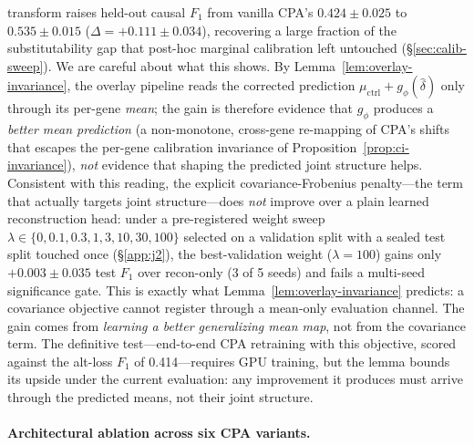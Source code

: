 \documentclass{article}
\theoremstyle{plain}
\theoremstyle{definition}
\theoremstyle{remark}
\begin{document}
transform raises held-out causal $F_1$ from vanilla CPA's $0.424 \pm 0.025$ to $0.535 \pm 0.015$ ($\Delta = +0.111 \pm 0.034$), recovering a large fraction of the substitutability gap that post-hoc marginal calibration left untouched (\S\ref{sec:calib-sweep}). We are careful about what this shows. By Lemma~\ref{lem:overlay-invariance}, the overlay pipeline reads the corrected prediction $\mu_{\text{ctrl}}+g_\phi(\hat\delta)$ only through its per-gene \emph{mean}; the gain is therefore evidence that $g_\phi$ produces a \emph{better mean prediction} (a non-monotone, cross-gene re-mapping of CPA's shifts that escapes the per-gene calibration invariance of Proposition~\ref{prop:ci-invariance}), \emph{not} evidence that shaping the predicted joint structure helps. Consistent with this reading, the explicit covariance-Frobenius penalty---the term that actually targets joint structure---does \emph{not} improve over a plain learned reconstruction head: under a pre-registered weight sweep $\lambda\in\{0,0.1,0.3,1,3,10,30,100\}$ selected on a validation split with a sealed test split touched once (\S\ref{app:j2}), the best-validation weight ($\lambda{=}100$) gains only $+0.003 \pm 0.035$ test $F_1$ over recon-only (3 of 5 seeds) and fails a multi-seed significance gate. This is exactly what Lemma~\ref{lem:overlay-invariance} predicts: a covariance objective cannot register through a mean-only evaluation channel. The gain comes from \emph{learning a better generalizing mean map}, not from the covariance term. The definitive test---end-to-end CPA retraining with this objective, scored against the alt-loss $F_1$ of 0.414---requires GPU training, but the lemma bounds its upside under the current evaluation: any improvement it produces must arrive through the predicted means, not their joint structure.

\paragraph{Architectural ablation across six CPA variants.}
\end{document}
